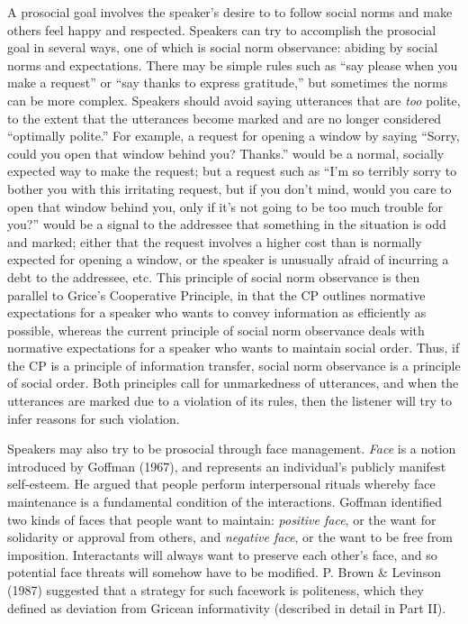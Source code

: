 \documentclass[oneside]{report}
\begin{document}
A prosocial goal involves the speaker's desire to to follow social norms
and make others feel happy and respected. Speakers can try to accomplish
the prosocial goal in several ways, one of which is social norm
observance: abiding by social norms and expectations. There may be
simple rules such as ``say please when you make a request'' or ``say
thanks to express gratitude,'' but sometimes the norms can be more
complex. Speakers should avoid saying utterances that are \emph{too}
polite, to the extent that the utterances become marked and are no
longer considered ``optimally polite.'' For example, a request for
opening a window by saying ``Sorry, could you open that window behind
you? Thanks.'' would be a normal, socially expected way to make the
request; but a request such as ``I'm so terribly sorry to bother you
with this irritating request, but if you don't mind, would you care to
open that window behind you, only if it's not going to be too much
trouble for you?'' would be a signal to the addressee that something in
the situation is odd and marked; either that the request involves a
higher cost than is normally expected for opening a window, or the
speaker is unusually afraid of incurring a debt to the addressee, etc.
This principle of social norm observance is then parallel to Grice's
Cooperative Principle, in that the CP outlines normative expectations
for a speaker who wants to convey information as efficiently as
possible, whereas the current principle of social norm observance deals
with normative expectations for a speaker who wants to maintain social
order. Thus, if the CP is a principle of information transfer, social
norm observance is a principle of social order. Both principles call for
unmarkedness of utterances, and when the utterances are marked due to a
violation of its rules, then the listener will try to infer reasons for
such violation.

Speakers may also try to be prosocial through face management.
\emph{Face} is a notion introduced by Goffman (1967), and represents an
individual's publicly manifest self-esteem. He argued that people
perform interpersonal rituals whereby face maintenance is a fundamental
condition of the interactions. Goffman identified two kinds of faces
that people want to maintain: \emph{positive face}, or the want for
solidarity or approval from others, and \emph{negative face}, or the
want to be free from imposition. Interactants will always want to
preserve each other's face, and so potential face threats will somehow
have to be modified. P. Brown \& Levinson (1987) suggested that a
strategy for such facework is politeness, which they defined as
deviation from Gricean informativity (described in detail in Part II).
\end{document}

